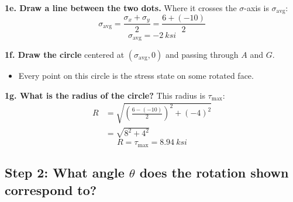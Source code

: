 \documentclass[11pt]{article}
\begin{document}
\bigskip
\noindent
\begin{minipage}[c]{0.45\textwidth}
\textbf{1e. Draw a line between the two dots.} Where it crosses the $\sigma$-axis is
$\sigma_{\text{avg}}$:
\[ \sigma_{\text{avg}} = \frac{\sigma_x + \sigma_y}{2} = \frac{6 + (-10)}{2} \]
\[ \boxed{\sigma_{\text{avg}} = -\SI{2}{ksi}} \]
\end{minipage}%
\hfill
\begin{minipage}[c]{0.52\textwidth}
\centering{}
\end{minipage}

\bigskip
\noindent
\begin{minipage}[c]{0.45\textwidth}
\textbf{1f. Draw the circle} centered at $(\sigma_{\text{avg}}, 0)$ and passing through
$A$ and $G$.
\begin{itemize}[label=\then]
  \item Every point on this circle is the stress state on some rotated face.
\end{itemize}
\end{minipage}%
\hfill
\begin{minipage}[c]{0.52\textwidth}
\centering{}
\end{minipage}

\bigskip
\noindent
\begin{minipage}[c]{0.45\textwidth}
\textbf{1g. What is the radius of the circle?} This radius is $\tau_{\max}$:
\begin{align*}
  R &= \sqrt{\left(\frac{6 - (-10)}{2}\right)^2 + (-4)^2} \\
    &= \sqrt{8^2 + 4^2}
\end{align*}
\[ \boxed{R = \tau_{\max} = \SI{8.94}{ksi}} \]
\end{minipage}%
\hfill
\begin{minipage}[c]{0.52\textwidth}
\centering{}
\end{minipage}

\subsection*{Step 2: What angle $\theta$ does the rotation shown correspond to?}
\end{document}
